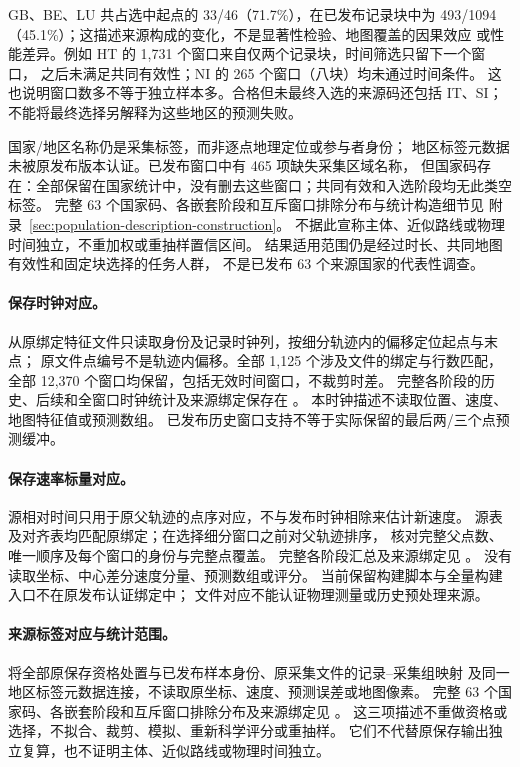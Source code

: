 GB、BE、LU 共占选中起点的 33/46（71.7\%），在已发布记录块中为
493/1094（45.1\%）；这描述来源构成的变化，不是显著性检验、地图覆盖的因果效应
或性能差异。例如 HT 的 1,731 个窗口来自仅两个记录块，时间筛选只留下一个窗口，
之后未满足共同有效性；NI 的 265 个窗口（八块）均未通过时间条件。
这也说明窗口数多不等于独立样本多。合格但未最终入选的来源码还包括 IT、SI；
不能将最终选择另解释为这些地区的预测失败。

国家/地区名称仍是采集标签，而非逐点地理定位或参与者身份；
地区标签元数据未被原发布版本认证。已发布窗口中有 465 项缺失采集区域名称，
但国家码存在：全部保留在国家统计中，没有删去这些窗口；共同有效和入选阶段均无此类空标签。
完整 63 个国家码、各嵌套阶段和互斥窗口排除分布与统计构造细节见
附录~\ref{sec:population-description-construction}。
不据此宣称主体、近似路线或物理时间独立，不重加权或重抽样置信区间。
结果适用范围仍是经过时长、共同地图有效性和固定块选择的任务人群，
不是已发布 63 个来源国家的代表性调查。

\paragraph{保存时钟对应。}
从原绑定特征文件只读取身份及记录时钟列，按细分轨迹内的偏移定位起点与末点；
原文件点编号不是轨迹内偏移。全部 1,125 个涉及文件的绑定与行数匹配，
全部 12,370 个窗口均保留，包括无效时间窗口，不裁剪时差。
完整各阶段的历史、后续和全窗口时钟统计及来源绑定保存在
。
本时钟描述不读取位置、速度、地图特征值或预测数组。
已发布历史窗口支持不等于实际保留的最后两/三个点预测缓冲。

\paragraph{保存速率标量对应。}
源相对时间只用于原父轨迹的点序对应，不与发布时钟相除来估计新速度。
源表及对齐表均匹配原绑定；在选择细分窗口之前对父轨迹排序，
核对完整父点数、唯一顺序及每个窗口的身份与完整点覆盖。
完整各阶段汇总及来源绑定见
。
没有读取坐标、中心差分速度分量、预测数组或评分。
当前保留构建脚本与全量构建入口不在原发布认证绑定中；
文件对应不能认证物理测量或历史预处理来源。

\paragraph{来源标签对应与统计范围。}
将全部原保存资格处置与已发布样本身份、原采集文件的记录--采集组映射
及同一地区标签元数据连接，不读取原坐标、速度、预测误差或地图像素。
完整 63 个国家码、各嵌套阶段和互斥窗口排除分布及来源绑定见
。
这三项描述不重做资格或选择，不拟合、裁剪、模拟、重新科学评分或重抽样。
它们不代替原保存输出独立复算，也不证明主体、近似路线或物理时间独立。



